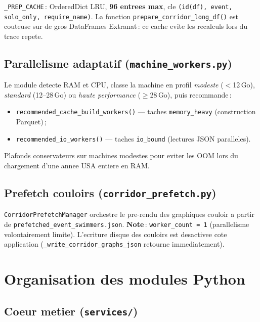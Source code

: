 \documentclass[11pt,a4paper]{article}
\begin{document}
\texttt{\_PREP\_CACHE}\,: OrderedDict LRU, \textbf{96 entrees max}, cle \texttt{(id(df), event, solo\_only, require\_name)}. La fonction \texttt{prepare\_corridor\_long\_df()} est couteuse sur de gros DataFrames Extranat\,: ce cache evite les recalculs lors du trace repete.

\subsection{Parallelisme adaptatif (\texttt{machine\_workers.py})}

Le module detecte RAM et CPU, classe la machine en profil \emph{modeste} ($<$12\,Go), \emph{standard} (12--28\,Go) ou \emph{haute performance} ($\geq$28\,Go), puis recommande\,:
\begin{itemize}
  \item \texttt{recommended\_cache\_build\_workers()} --- taches \texttt{memory\_heavy} (construction Parquet)\,;
  \item \texttt{recommended\_io\_workers()} --- taches \texttt{io\_bound} (lectures JSON paralleles).
\end{itemize}

Plafonds conservateurs sur machines modestes pour eviter les OOM lors du chargement d'une annee USA entiere en RAM.

\subsection{Prefetch couloirs (\texttt{corridor\_prefetch.py})}

\texttt{CorridorPrefetchManager} orchestre le pre-rendu des graphiques couloir a partir de \texttt{prefetched\_event\_swimmers.json}. \textbf{Note}\,: \texttt{worker\_count = 1} (parallelisme volontairement limite). L'ecriture disque des couloirs est desactivee cote application (\texttt{\_write\_corridor\_graphs\_json} retourne immediatement).

\section{Organisation des modules Python}

\subsection{Coeur metier (\texttt{services/})}
\end{document}

